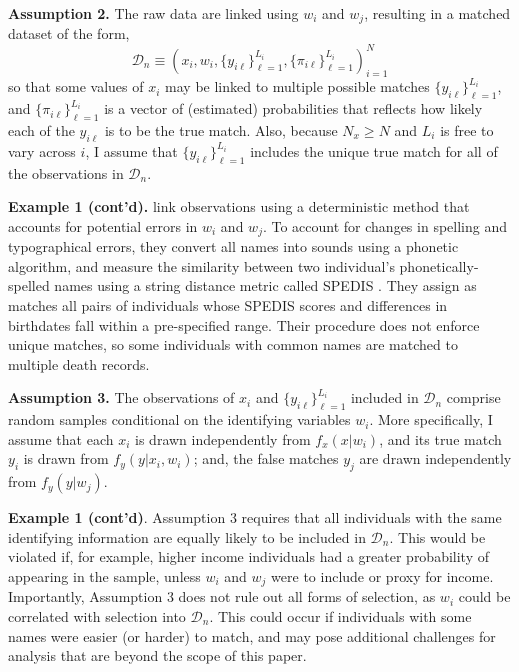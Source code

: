 \documentclass[12pt]{article}
\begin{document}
\textbf{Assumption 2.}  The raw data are linked using $w_i$ and $w_j$, resulting in a matched dataset of the form,
\begin{equation} \mathcal{D}_n \equiv \left(x_i, w_i, \{y_{i\ell}\}_{\ell=1}^{L_i}, \{\pi_{i\ell}\}_{\ell=1}^{L_i}\right)_{i=1}^N \label{data} \end{equation}
so that some values of $x_i$ may be linked to multiple possible matches $\{y_{i\ell}\}_{\ell=1}^{L_i}$, and $\{\pi_{i\ell}\}_{\ell=1}^{L_i}$ is a vector of (estimated) probabilities that reflects how likely each of the $y_{i\ell}$ is to be the true match.  Also, because $N_x \geq N$ and $L_i$ is free to vary across $i$, I assume that $\{y_{i\ell}\}_{\ell=1}^{L_i}$ includes the unique true match for all of the observations in $\mathcal{D}_n$.  

\addlinespace
\textbf{Example 1 (cont'd).} \citet*{aizer2016} link observations using a deterministic method that accounts for potential errors in $w_i$ and $w_j$.  To account for changes in spelling and typographical errors, they convert all names into sounds using a phonetic algorithm, and measure the similarity between two individual's phonetically-spelled names using a string distance metric called SPEDIS \citep{spedis}.  They assign as matches all pairs of individuals whose SPEDIS scores and differences in birthdates fall within a pre-specified range.  Their procedure does not enforce unique matches, so some individuals with common names are matched to multiple death records.
\addlinespace

\textbf{Assumption 3.} The observations of $x_i$ and $\{y_{i\ell}\}_{\ell=1}^{L_i}$ included in $\mathcal{D}_n$ comprise random samples conditional on the identifying variables $w_i$.  More specifically, I assume that each $x_i$ is drawn independently from $f_x(x | w_i)$, and its true match $y_i$ is drawn from $f_y(y | x_i, w_i)$; and, the false matches $y_j$ are drawn independently from $f_y(y | w_j)$.   

\addlinespace
\textbf{Example 1 (cont'd)}.  Assumption 3 requires that all individuals with the same identifying information are equally likely to be included in $\mathcal{D}_n$.  This would be violated if, for example, higher income individuals had a greater probability of appearing in the sample, unless $w_i$ and $w_j$ were to include or proxy for income.  Importantly, Assumption 3 does not rule out all forms of selection, as $w_i$ could be correlated with selection into $\mathcal{D}_n$.  This could occur if individuals with some names were easier (or harder) to match, and may pose additional challenges for analysis that are beyond the scope of this paper. 
\end{document}
